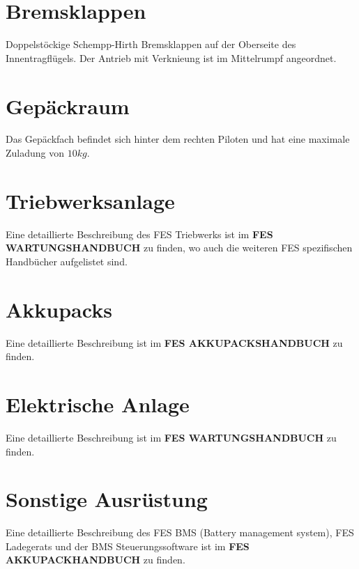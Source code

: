 \section{Bremsklappen}
Doppelstöckige Schempp-Hirth Bremsklappen auf der Oberseite des Innentragflügels. Der Antrieb mit Verknieung ist im Mittelrumpf angeordnet.

\section{Gepäckraum}
Das Gepäckfach befindet sich hinter dem rechten Piloten und hat eine maximale Zuladung von $10kg$.

\section{Triebwerksanlage}
Eine detaillierte Beschreibung des FES Triebwerks ist im \textbf{FES WARTUNGSHANDBUCH} zu finden, wo auch die weiteren FES spezifischen Handbücher
aufgelistet sind.

\section{Akkupacks}
Eine detaillierte Beschreibung ist im \textbf{FES AKKUPACKSHANDBUCH} zu finden.

\section{Elektrische Anlage}
Eine detaillierte Beschreibung ist im \textbf{FES WARTUNGSHANDBUCH} zu finden.

\section{Sonstige Ausrüstung}
Eine detaillierte Beschreibung des FES BMS (Battery management system), FES Ladegerats und der BMS Steuerungssoftware ist im \textbf{FES AKKUPACKHANDBUCH} zu
finden.
